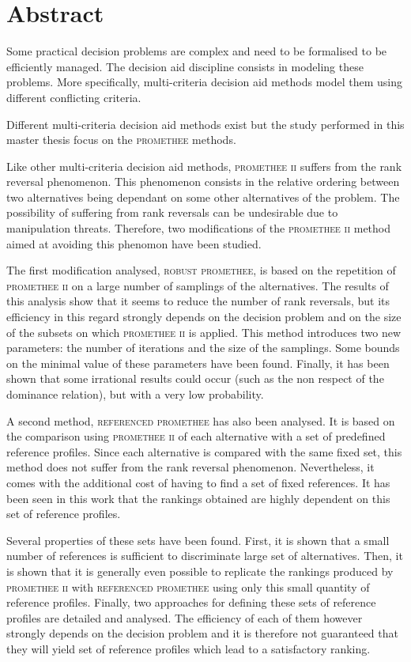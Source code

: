 \chapter*{\centering Abstract}


Some practical decision problems are complex and need to be formalised to be efficiently managed.
The decision aid discipline consists in modeling these problems.
More specifically, multi-criteria decision aid methods model them using different conflicting criteria.

Different multi-criteria decision aid methods exist but the study performed in this master thesis focus on the \textsc{promethee} methods.

Like other multi-criteria decision aid methods, \textsc{promethee ii} suffers from the rank reversal phenomenon.
This phenomenon consists in the relative ordering between two alternatives being dependant on some other alternatives of the problem.
The possibility of suffering from rank reversals can be undesirable due to manipulation threats.
Therefore, two modifications of the \textsc{promethee ii} method aimed at avoiding this phenomon have been studied.

The first modification analysed, \textsc{robust promethee}, is based on the repetition of \textsc{promethee ii} on a large number of samplings of the alternatives.
The results of this analysis show that it seems to reduce the number of rank reversals, but its efficiency in this regard strongly depends on the decision problem and on the size of the subsets on which \textsc{promethee ii} is applied.
This method introduces two new parameters: the number of iterations and the size of the samplings.
Some bounds on the minimal value of these parameters have been found.
Finally, it has been shown that some irrational results could occur (such as the non respect of the dominance relation), but with a very low probability.

A second method, \textsc{referenced promethee} has also been analysed.
It is based on the comparison using \textsc{promethee ii} of each alternative with a set of predefined reference profiles.
Since each alternative is compared with the same fixed set, this method does not suffer from the rank reversal phenomenon.
Nevertheless, it comes with the additional cost of having to find a set of fixed references.
It has been seen in this work that the rankings obtained are highly dependent on this set of reference profiles.

\newpage 
Several properties of these sets have been found. First, it is shown that a small number of references is sufficient to discriminate large set of alternatives.
Then, it is shown that it is generally even possible to replicate the rankings produced by \textsc{promethee ii} with \textsc{referenced promethee} using only this small quantity of reference profiles.
Finally, two approaches for defining these sets of reference profiles are detailed and analysed. The efficiency of each of them however strongly depends on the decision problem and it is therefore not guaranteed that they will yield set of reference profiles which lead to a satisfactory ranking.


